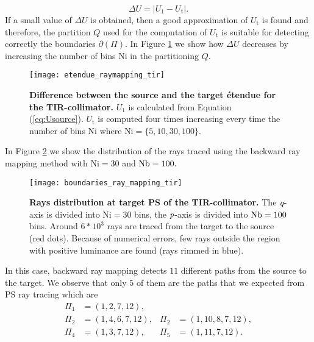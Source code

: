\begin{equation}\label{eq:delta_raymapping}
\Delta U =  \big|U_1-U_{\textrm{t}}\big|.
\end{equation}
If a small value of $\Delta U$ is obtained, then a good approximation of $U_{\textrm{t}}$ is found and therefore, the partition $Q$ used for the computation of $U_{\textrm{t}}$ is suitable for detecting correctly the boundaries $\partial$$(\Pi)$. In Figure \ref{fig:etendue_raymapping_tir} we show how $\Delta U$ decreases by increasing the number of bins $\textrm{Ni}$ in the partitioning $Q$.  
\begin{figure}[h]
  \begin{center}
  \texttt{[image: etendue\_raymapping\_tir]}
  \end{center}
  \caption{\textbf{Difference between the source and the target \'{e}tendue for the TIR-collimator.}
 $U_1$ is calculated from Equation (\ref{eq:Usource}). $U_{\textrm{t}}$ is computed four times increasing every time the number of bins $\textrm{Ni}$ where $\textrm{Ni}=\{5,10,30,100\}$. }
\label{fig:etendue_raymapping_tir}
 \end{figure}
In Figure \ref{fig:boundaries_TIR_ray_mapping} we show the distribution of the rays traced using the backward ray mapping method with $\textrm{Ni}=30$ and $\textrm{Nb} = 100.$ 
\begin{figure}[h]
  \begin{center}
  \texttt{[image: boundaries\_ray\_mapping\_tir]}
  \end{center}
  \caption{\textbf{Rays distribution at target PS of the TIR-collimator.}
 The $\textit{q}$-axis is divided into $\textrm{Ni}=30$ bins, the $\textit{p}$-axis is divided into $\textrm{Nb} = 100$ bins. Around $6*10^3$ rays are traced from the target to the source (red dots). Because of numerical errors, few rays outside the region with positive luminance are found (rays rimmed in blue).}
\label{fig:boundaries_TIR_ray_mapping}
 \end{figure}
In this case, backward ray mapping detects $11$ different paths from the source to the target. 
We observe that only $5$ of them are the paths that we expected from PS ray tracing which are
\begin{equation}\label{eq:paths_tir}
\begin{array}{llll}
\Pi_1&=(1,2,7,12), \\
\Pi_2&=(1,4,6,7,12), & \Pi_2&=(1,10,8,7,12),\\
\Pi_4&=(1,3,7,12), & \Pi_5&=(1,11,7,12).
\end{array}\end{equation}
